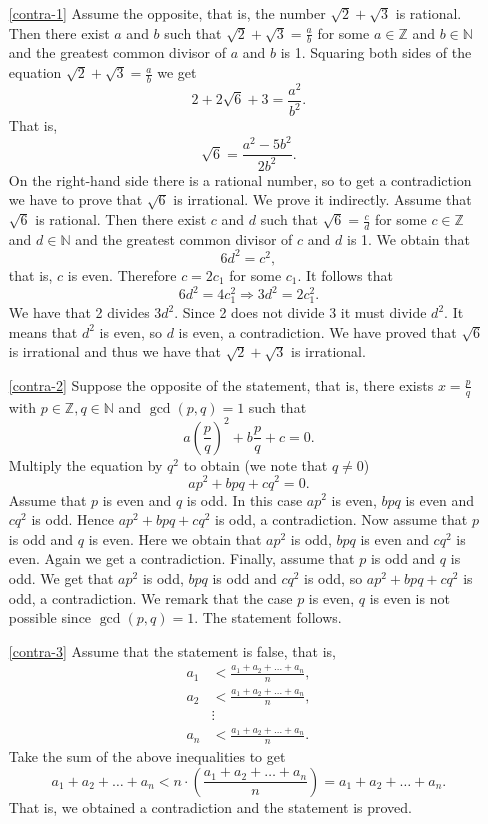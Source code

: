 \begin{enumerate}
\item[\ref{contra-1}] Assume the opposite, that is, the number $\sqrt{2}+\sqrt{3}$ is rational. Then there exist
$a$ and $b$ such that $\sqrt{2}+\sqrt{3}=\frac{a}{b}$ for some $a\in\mathbb{Z}$ and $b\in\mathbb{N}$ and the greatest common divisor of $a$ and $b$ is 1.
Squaring both sides of the equation $\sqrt{2}+\sqrt{3}=\frac{a}{b}$ we get
$$
2+2\sqrt{6}+3=\frac{a^2}{b^2}.
$$
That is, 
$$
\sqrt{6}=\frac{a^2-5b^2}{2b^2}.
$$
On the right-hand side there is a rational number, so to get a contradiction we have to prove that $\sqrt{6}$ is irrational.
We prove it indirectly. Assume that $\sqrt{6}$ is rational. Then there exist $c$ and $d$ such that $\sqrt{6}=\frac{c}{d}$ for some $c\in\mathbb{Z}$ and $d\in\mathbb{N}$ 
and the greatest common divisor of $c$ and $d$ is 1. We obtain that
$$
6d^2=c^2,
$$
that is, $c$ is even. Therefore $c=2c_1$ for some $c_1$. It follows that
$$
6d^2=4c_1^2\Rightarrow 3d^2=2c_1^2.
$$
We have that 2 divides $3d^2$. Since 2 does not divide 3 it must divide $d^2$. It means that $d^2$ is even, so $d$ is even, a contradiction.
We have proved that $\sqrt{6}$ is irrational and thus we have that $\sqrt{2}+\sqrt{3}$ is irrational.

\item[\ref{contra-2}] Suppose the opposite of the statement, that is, there exists $x=\frac{p}{q}$ with $p\in\mathbb{Z},q\in\mathbb{N}$
and $\gcd(p,q)=1$ such that
$$
a\left(\frac{p}{q}\right)^2+b\frac{p}{q}+c=0.
$$
Multiply the equation by $q^2$ to obtain (we note that $q\neq 0$)
$$
ap^2+bpq+cq^2=0.
$$
Assume that $p$ is even and $q$ is odd. In this case $ap^2$ is even, $bpq$ is even and $cq^2$ is odd. Hence $ap^2+bpq+cq^2$ is odd,
a contradiction. Now assume that $p$ is odd and $q$ is even. Here we obtain that $ap^2$ is odd, $bpq$ is even and $cq^2$ is even.
Again we get a contradiction. Finally, assume that $p$ is odd and $q$ is odd. We get that $ap^2$ is odd, $bpq$ is odd and $cq^2$ is odd,
so $ap^2+bpq+cq^2$ is odd, a contradiction. We remark that the case $p$ is even, $q$ is even is not possible since $\gcd(p,q)=1$.
The statement follows.

\item[\ref{contra-3}] Assume that the statement is false, that is, 
\begin{align*}
a_1&<\frac{a_1+a_2+\ldots+a_n}{n},\\
a_2&<\frac{a_1+a_2+\ldots+a_n}{n},\\
&\vdots\\
a_n&<\frac{a_1+a_2+\ldots+a_n}{n}.
\end{align*}
Take the sum of the above inequalities to get
$$
a_1+a_2+\ldots+a_n<n\cdot\left(\frac{a_1+a_2+\ldots+a_n}{n}\right)=a_1+a_2+\ldots+a_n.
$$
That is, we obtained a contradiction and the statement is proved.


\end{enumerate}
